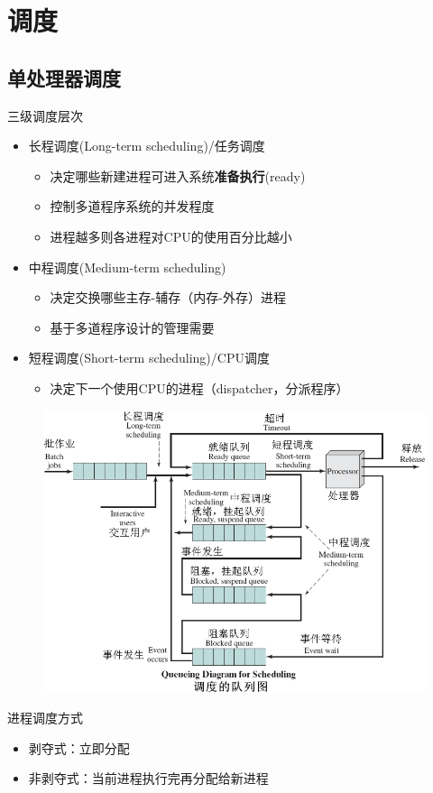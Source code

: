 
\section{调度}
\subsection{单处理器调度}
三级调度层次
\begin{itemize}
    \item 长程调度(Long-term scheduling)/任务调度
    \begin{itemize}
    \item 决定哪些新建进程可进入系统\textbf{准备执行}(ready)
    \item 控制多道程序系统的并发程度
    \item 进程越多则各进程对CPU的使用百分比越小
    \end{itemize}
    \item 中程调度(Medium-term scheduling)
    \begin{itemize}
    \item 决定交换哪些主存-辅存（内存-外存）进程
    \item 基于多道程序设计的管理需要
    \end{itemize}
    \item 短程调度(Short-term scheduling)/CPU调度
    \begin{itemize}
    \item 决定下一个使用CPU的进程（dispatcher，分派程序）
    \end{itemize}
\end{itemize}

\begin{figure}[H]
    \centering
    \includegraphics[width=0.6\linewidth]{fig/process_scheduling.png}
\end{figure}

进程调度方式
\begin{itemize}
    \item 剥夺式：立即分配
    \item 非剥夺式：当前进程执行完再分配给新进程
\end{itemize}

